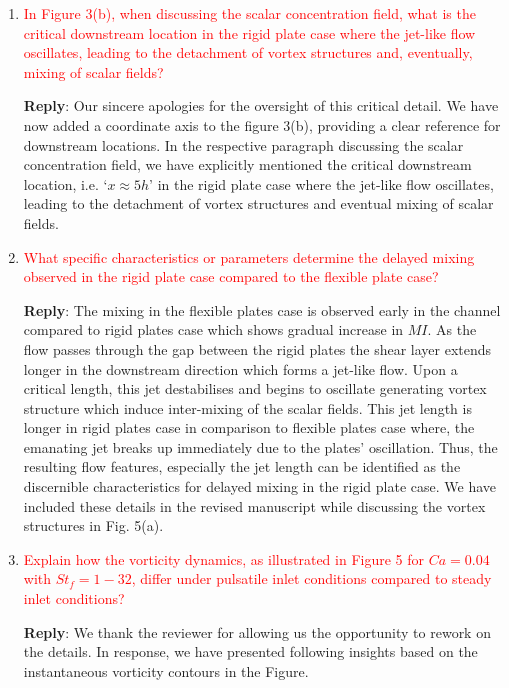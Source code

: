 \documentclass[onecolumn,a4paper,amsmath,amssym,pre]{revtex4}
\begin{document}
\begin{enumerate}
					\item \textcolor{red}{In Figure 3(b), when discussing the scalar concentration field, what is the critical downstream location in the rigid plate case where the jet-like flow oscillates, leading to the detachment of vortex structures and, eventually, mixing of scalar fields?}
					
					\textbf{Reply}: Our sincere apologies for the oversight of this critical detail. We have now added a coordinate axis to the figure 3(b), providing a clear reference for downstream locations. In the respective paragraph discussing the scalar concentration field, we have explicitly mentioned the critical downstream location, i.e. `$x\approx5h$' in the rigid plate case where the jet-like flow oscillates, leading to the detachment of vortex structures and eventual mixing of scalar fields.
					
					\item \textcolor{red}{What specific characteristics or parameters determine the delayed mixing observed in the rigid plate case compared to the flexible plate case?}
					
					\textbf{Reply}: The mixing in the flexible plates case is observed early in the channel compared to rigid plates case which shows gradual increase in $MI$. As the flow passes through the gap between the rigid plates the shear layer extends longer in the downstream direction which forms a jet-like flow. Upon a critical length, this jet destabilises and begins to oscillate generating vortex structure which induce inter-mixing of the scalar fields. This jet length is longer in rigid plates case in comparison to flexible plates case where, the emanating jet breaks up immediately due to the plates' oscillation. Thus, the resulting flow features, especially the jet length can be identified as the discernible characteristics for delayed mixing in the rigid plate case. We have included these details in the revised manuscript while discussing the vortex structures in Fig. 5(a).
					
					\item \textcolor{red}{Explain how the vorticity dynamics, as illustrated in Figure 5 for $Ca = 0.04$ with $St_f = 1-32$, differ under pulsatile inlet conditions compared to steady inlet conditions?}
					
					
					\textbf{Reply}: We thank the reviewer for allowing us the opportunity to rework on the details. In response, we have presented following insights based on the instantaneous vorticity contours in the Figure.
					

\end{enumerate}
\end{document}
